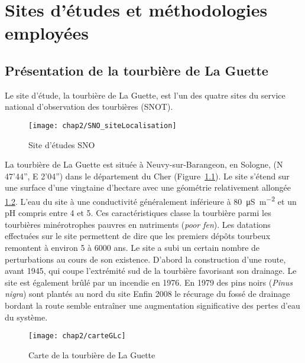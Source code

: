 
\chapter{Sites d'études et méthodologies employées}

\minitoc

\newpage

\section{Présentation de la tourbière de La Guette}

Le site d'étude, la tourbière de La Guette, est l'un des quatre sites du service national d'observation des tourbières (SNOT).


\begin{figure}[h]
\centering
\texttt{[image: chap2/SNO\_siteLocalisation]}
\caption{Site d'études SNO}
\label{fig:carte_europe}
\end{figure}

La tourbière de La Guette est située à Neuvy-sur-Barangeon, en Sologne, (N 47’44”, E 2’04”) dans le département du Cher (Figure~\ref{fig:carte_europe}).
Le site s'étend sur une surface d'une vingtaine d'hectare avec une géométrie relativement allongée \ref{fig:carte_LG}.
L'eau du site à une conductivité généralement inférieure à \SI{80}{\micro\siemens\per\square\metre} et un pH compris entre 4 et 5.
Ces caractéristiques classe la tourbière parmi les tourbières minérotrophes pauvres en nutriments (\textit{poor fen}).
Les datations effectuées sur le site permettent de dire que les premiers dépôts tourbeux remontent à environ 5 à 6000 ans.
Le site a subi un certain nombre de perturbations au cours de son existence.
D'abord la construction d'une route, avant 1945, qui coupe l'extrémité sud de la tourbière favorisant son drainage.
Le site est également brûlé par un incendie en 1976.
En 1979 des pins noirs (\textit{Pinus nigra}) sont plantés au nord du site
Enfin 2008 le récurage du fossé de drainage bordant la route semble entraîner une augmentation significative des pertes d'eau du système.

\begin{figure}
\texttt{[image: chap2/carteGLc]}
\caption{Carte de la tourbière de La Guette}
\label{fig:carte_LG}
\end{figure}

